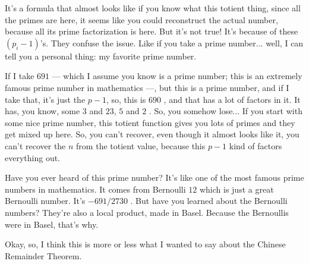 \begin{speech}[00:20:45 - 00:22:20]
It's a formula that almost looks like if you know what this totient thing, since all the primes are here, it seems like you could reconstruct the actual number, because all its prime factorization is here. But it's not true! It's because of these $(p_i - 1)$'s. They confuse the issue. Like if you take a prime number... well, I can tell you a personal thing: my favorite prime number.

If I take $691$  --- which I assume you know is a prime number; this is an extremely famous prime number in mathematics ---, but this is a prime number, and if I take that, it's just the $p - 1$, so, this is $690$ , and that has a lot of factors in it. It has, you know, some $3$ and $23$, $5$ and $2$ . So, you somehow lose... If you start with some nice prime number, this totient function gives you lots of primes and they get mixed up here. So, you can't recover, even though it almost looks like it, you can't recover the $n$ from the totient value, because this $p - 1$ kind of factors everything out.

Have you ever heard of this prime number? It's like one of the most famous prime numbers in mathematics. It comes from Bernoulli $12$  which is just a great Bernoulli number. It's $-691 / 2730$ . But have you learned about the Bernoulli numbers? They're also a local product, made in Basel. Because the Bernoullis were in Basel, that's why.

Okay, so, I think this is more or less what I wanted to say about the Chinese Remainder Theorem.
\end{speech}

